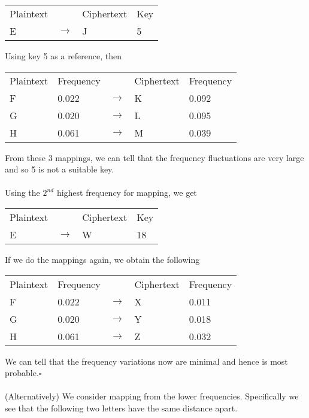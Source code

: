 \documentclass[12pt]{article}
\newcommand{\EOQ}{\hfill $\square$}
\begin{document}
\begin{enumerate}[(a)]
\begin{table}[H]
\centering
\begin{tabular}{llll}
Plaintext &   & Ciphertext & Key \\
E         & $\rightarrow$ & J          & 5  
\end{tabular}
\end{table}
Using key 5 as a reference, then
\begin{table}[H]
\centering
\begin{tabular}{lllll}
Plaintext & Frequency &   & Ciphertext & Frequency \\
F         & 0.022     & $\rightarrow$ & K          & 0.092     \\
G         & 0.020     & $\rightarrow$ & L          & 0.095     \\
H         & 0.061     & $\rightarrow$ & M          & 0.039        
\end{tabular}
\end{table}
From these 3 mappings, we can tell that the frequency fluctuations are very large and so 5 is not a suitable key.\\\\Using the $2^{nd}$ highest frequency for mapping, we get
\begin{table}[H]
\centering
\begin{tabular}{llll}
Plaintext &   & Ciphertext & Key \\
E         & $\rightarrow$ & W          & 18  
\end{tabular}
\end{table}
If we do the mappings again, we obtain the following
\begin{table}[H]
\centering
\begin{tabular}{lllll}
Plaintext & Frequency &   & Ciphertext & Frequency \\
F         & 0.022     & $\rightarrow$ & X          & 0.011     \\
G         & 0.020     & $\rightarrow$ & Y          & 0.018     \\
H         & 0.061     & $\rightarrow$ & Z          & 0.032        
\end{tabular}
\end{table}
We can tell that the frequency variations now are minimal and hence is most probable.\EOQ\\\\
(Alternatively) We consider mapping from the lower frequencies. Specifically we see that the following two letters have the same distance apart.
\begin{table}[H]

\end{table}
\end{enumerate}
\end{document}
